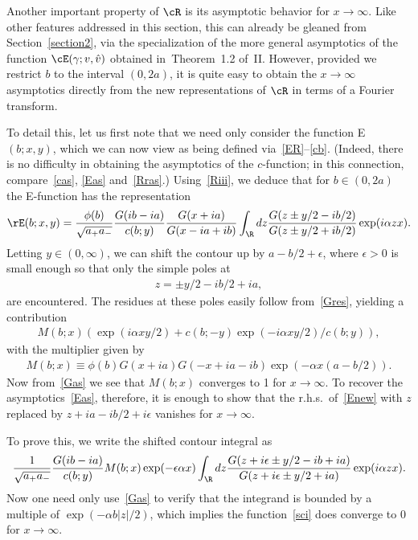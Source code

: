 \documentclass[pdftex]{sigma}
\numberwithin{equation}{section}
\begin{document}
Another important property of $\cR$ is its asymptotic behavior for $x\to \infty$. Like other features addressed in this section, this can already be gleaned from Section~\ref{section2}, via the specialization of the more general asymptotics  of the function $\cE(\gamma;v,\hat{v})$ obtained in~Theorem~1.2 of~II. However, provided we restrict $b$ to the interval $(0,2a)$, it is quite easy to obtain the $x\to \infty$ asymptotics directly from the new representations of $\cR$ in terms of a Fourier transform.

To detail this, let us f\/irst note that we need only consider the function E$(b;x,y)$, which we can now view as being def\/ined via~\eqref{ER}--\eqref{cb}. (Indeed, there is no dif\/f\/iculty in obtai\-ning the asymptotics of the $c$-function; in this connection, compare~\eqref{cas}, \eqref{Eas} and~\eqref{Rras}.) Using~\eqref{Riii}, we deduce that for $b\in(0,2a)$ the E-function has the representation
\begin{gather}\label{Enew}
\rE(b;x,y)=\frac{\phi(b)}{\sqrt{a_+a_-}}\frac{G(ib-ia)}{c(b;y)}\frac{G(x+ia)}{G(x-ia+ib)}
\int_{\R}dz\frac{G(z\pm y/2-ib/2)}{G(z\pm y/2+ib/2)}\exp(i\alpha zx).
\end{gather}
Letting $y\in(0,\infty)$, we can shift the contour up by $a-b/2 +\epsilon$, where $\epsilon>0$ is small enough so that only the simple poles at
\begin{gather}
z=\pm y/2 -ib/2+ia,
\end{gather}
are encountered. The residues at these poles easily follow from~\eqref{Gres}, yielding a contribution
\begin{gather}\label{ressum}
M(b;x)(\exp(i\alpha xy/2)+c(b;-y)\exp(-i\alpha xy/2)/c(b;y)),
\end{gather}
with the multiplier given by
\begin{gather}
M(b;x)\equiv \phi(b) G(x+ia)G(-x +ia-ib)\exp(-\alpha x (a-b/2)).
\end{gather}
Now from~\eqref{Gas} we see that $M(b;x)$ converges to 1 for $x\to \infty$. To recover the asymptotics~\eqref{Eas}, therefore, it is enough to show that the r.h.s.\ of~\eqref{Enew} with $z$ replaced by $z+ia-ib/2+i\epsilon$ vanishes for $x\to \infty$.

To prove this, we write the shifted contour integral as
\begin{gather}\label{sci}
\frac{1}{\sqrt{a_+a_-}}\frac{G(ib-ia)}{c(b;y)}M(b;x)\exp(-\epsilon\alpha x)
\int_{\R}dz\frac{G(z+i\epsilon \pm y/2-ib+ia)}{G(z+i\epsilon \pm y/2+ia)}\exp(i\alpha zx).
\end{gather}
Now one need only use~\eqref{Gas} to verify that the integrand is bounded by a multiple of \linebreak $\exp(-\alpha b|z|/2)$, which implies the function~\eqref{sci} does converge to 0 for $x\to\infty$.
\end{document}
